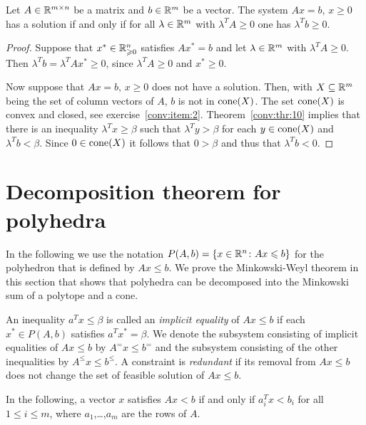 \begin{theorem}
  \label{conv:thr:12}
  Let $A \in \mathbb{R}^{m\times n}$ be a matrix and $b \in \mathbb{R}^m$ be a vector. The
  system $Ax = b, \,x\geq0$ has a solution if and only if for all $\lambda \in
  \mathbb{R}^m$ with $\lambda^TA\geq0$ one has $\lambda^Tb \geq0$.  
\end{theorem}

\begin{proof}
  Suppose that $x^* \in \mathbb{R}^n_{\geqslant0}$ satisfies $Ax^* = b$ and let $\lambda \in
  \mathbb{R}^m$ with $\lambda^T A \geq0$. Then $\lambda^Tb = \lambda^TA x^* \geq0$, since
  $\lambda^TA\geq0$ and $x^*\geq0$. 

  Now suppose that $Ax = b, \,x\geq0$ does not have a solution. Then,
  with   $X\subseteq\mathbb{R}^m$ being  the set of column vectors of $A$, 
  $b$ is not in $\mathrm{cone}(X)$. The set $\mathrm{cone}(X)$ is convex and
  closed, see exercise~\ref{conv:item:2}. Theorem~\ref{conv:thr:10} implies 
  that there is an inequality $\lambda^Tx \geq \beta$ such that $\lambda^Ty > \beta$ for
  each $y \in \mathrm{cone}(X)$ and $\lambda^Tb < \beta$. Since $0 \in \mathrm{cone}(X)$ it follows that $0 > \beta$ and thus that
  $\lambda^Tb<0$. 
  
\end{proof}

\section{Decomposition theorem for polyhedra}
\label{sec:decomp-theor-polyh}

In the following we use the notation $P(A,b) = \{x \in\mathbb{R}^n \colon Ax \leqslant b\}$ for the polyhedron that is defined by $Ax \leq b$. We prove the Minkowski-Weyl theorem in this section that shows that polyhedra can be decomposed into the Minkowski sum of a polytope and a cone. 

\begin{definition}
\label{po:def:5}
An inequality $a^Tx\leq\beta$ is called an \emph{implicit equality} of
$Ax\leq b$ if each $x^* \in P(A,b)$ satisfies $a^Tx^* = \beta$. We denote the
subsystem  consisting of implicit equalities of $Ax\leq b$ by $A^=x\leq b^=$
and the subsystem consisting of the other inequalities by
$A^\leq x\leq b^\leq$. A constraint is \emph{redundant} if its removal from
$Ax\leq b$ does not change the set of feasible solution of $Ax\leq b$.  
\end{definition}

In the following, a vector $x$ satisfies $Ax < b$ if and only if
$a_i^T x < b_i$ for all $1\leq i\leq m$, where $a_1$,\ldots,$a_m$ are the rows of $A$.

